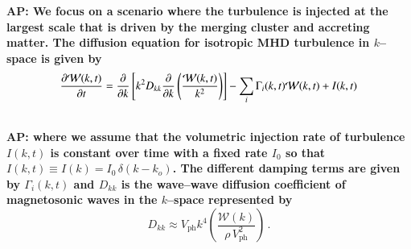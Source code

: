 \documentclass[useAMS,usenatbib]{mn2e}
\newcommand{\Vph}{V_\mathrm{ph}}
\def\AP#1{{\bf  AP: #1}}
\begin{document}
\AP{We focus on a scenario where the turbulence is injected at the
  largest scale that is driven by the merging cluster and accreting
  matter. The diffusion equation for isotropic MHD turbulence in
  $k$--space is given by}
\begin{eqnarray}
&{{\partial {\mathcal W}(k,t) }\over{\partial t}}
=
{{\partial}\over{\partial k}}
\left[
k^2 D_{kk}
{{\partial}\over{\partial k}}
\left( {{ {\mathcal W}(k,t) }\over{k^2}} \right)
\right]
- \sum_i \Gamma_i (k,t) {\mathcal W}(k,t)
+ I(k,t)\nonumber\\
&
\label{modes_kinetic}
\end{eqnarray}
\AP{where we assume that the volumetric injection rate of turbulence
  $I(k,t)$ is constant over time with a fixed rate $I_0$ so that
  $I(k,t) \equiv I(k) = I_0\,\delta (k - k_o)$. The different damping
  terms are given by $\Gamma_i(k,t)$ and $D_{kk}$ is the wave--wave diffusion
  coefficient of magnetosonic waves in the $k$--space represented by
  \begin{equation}
    \label{eq:Dkk}
    D_{kk} \approx \Vph k^4
    \left(\frac{\mathcal{W}(k)}{\rho\,\Vph^2}\right)\,.
  \end{equation}
}
\end{document}
